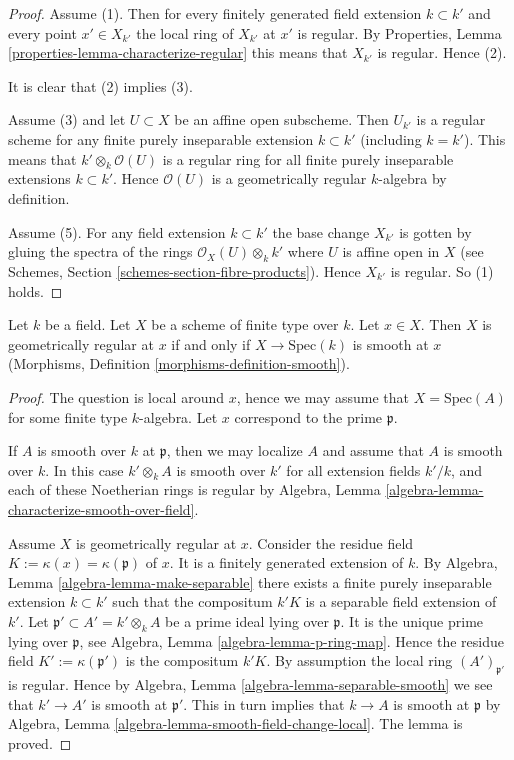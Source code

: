 \begin{proof}
Assume (1). Then for every finitely generated field extension
$k \subset k'$ and
every point $x' \in X_{k'}$ the local ring of $X_{k'}$ at $x'$
is regular. By Properties, Lemma \ref{properties-lemma-characterize-regular}
this means that $X_{k'}$ is regular. Hence (2).

\medskip\noindent
It is clear that (2) implies (3).

\medskip\noindent
Assume (3) and let $U \subset X$ be an affine open subscheme.
Then $U_{k'}$ is a regular scheme for any finite purely inseparable
extension $k \subset k'$ (including $k = k'$). This means that
$k' \otimes_k \mathcal{O}(U)$ is a regular ring for all
finite purely inseparable extensions $k \subset k'$. Hence
$\mathcal{O}(U)$ is a geometrically regular $k$-algebra by definition.

\medskip\noindent
Assume (5). For any field extension $k \subset k'$ the base
change $X_{k'}$ is gotten by gluing the spectra of the
rings $\mathcal{O}_X(U) \otimes_k k'$ where $U$ is affine open
in $X$ (see Schemes, Section \ref{schemes-section-fibre-products}).
Hence $X_{k'}$ is regular. So (1) holds.
\end{proof}

\begin{lemma}
\label{lemma-geometrically-regular-smooth}
Let $k$ be a field.
Let $X$ be a scheme of finite type over $k$.
Let $x \in X$.
Then $X$ is geometrically regular at $x$ if and only if $X \to \text{Spec}(k)$
is smooth at $x$ (Morphisms, Definition \ref{morphisms-definition-smooth}).
\end{lemma}

\begin{proof}
The question is local around $x$,
hence we may assume that $X = \text{Spec}(A)$
for some finite type $k$-algebra.
Let $x$ correspond to the prime $\mathfrak p$.

\medskip\noindent
If $A$ is smooth over $k$ at $\mathfrak p$, then we may localize $A$
and assume that $A$ is smooth over $k$. In this case $k' \otimes_k A$
is smooth over $k'$ for all extension fields $k'/k$, and each of
these Noetherian rings is regular by
Algebra, Lemma \ref{algebra-lemma-characterize-smooth-over-field}.

\medskip\noindent
Assume $X$ is geometrically regular at $x$.
Consider the residue field $K := \kappa(x) = \kappa(\mathfrak p)$ of $x$.
It is a finitely generated extension of $k$.
By Algebra, Lemma \ref{algebra-lemma-make-separable}
there exists a finite purely inseparable
extension $k \subset k'$ such that the compositum
$k'K$ is a separable field extension of $k'$.
Let $\mathfrak p' \subset A' = k' \otimes_k A$ be a prime ideal
lying over $\mathfrak p$. It is the unique prime lying over $\mathfrak p$, see
Algebra, Lemma \ref{algebra-lemma-p-ring-map}.
Hence the residue field $K' := \kappa(\mathfrak p')$
is the compositum $k'K$. By assumption the local ring
$(A')_{\mathfrak p'}$ is regular. Hence by
Algebra, Lemma \ref{algebra-lemma-separable-smooth}
we see that $k' \to A'$ is smooth at $\mathfrak p'$.
This in turn implies that $k \to A$ is smooth at $\mathfrak p$ by
Algebra, Lemma \ref{algebra-lemma-smooth-field-change-local}.
The lemma is proved.
\end{proof}


